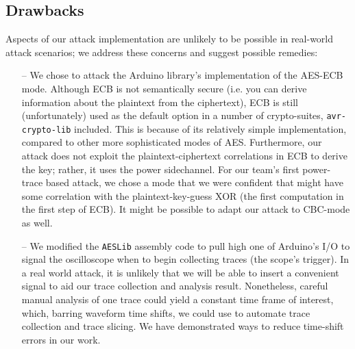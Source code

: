 \documentclass[journal]{ieee_style}
\begin{document}
\subsection{Drawbacks}
Aspects of our attack implementation are unlikely to be possible in real-world attack scenarios; we address these concerns and suggest possible remedies:
\begin{itemize}
    \item[--] We chose to attack the Arduino library's implementation of the AES-ECB mode. Although ECB is not semantically secure (i.e. you can derive information about the plaintext from the ciphertext), ECB is still (unfortunately) used as the default option in a number of crypto-suites, \texttt{avr-crypto-lib} included. This is because of its relatively simple implementation, compared to other more sophisticated modes of AES. Furthermore, our attack does not exploit the plaintext-ciphertext correlations in ECB to derive the key; rather, it uses the power sidechannel. For our team's first power-trace based attack, we chose a mode that we were confident that might have some correlation with the plaintext-key-guess XOR (the first computation in the first step of ECB). It might be possible to adapt our attack to CBC-mode as well.
    \item[--] We modified the \texttt{AESLib} assembly code to pull high one of Arduino's I/O to signal the oscilloscope when to begin collecting traces (the scope's trigger). In a real world attack, it is unlikely that we will be able to insert a convenient signal to aid our trace collection and analysis result. Nonetheless, careful manual analysis of one trace could yield a constant time frame of interest, which, barring waveform time shifts, we could use to automate trace collection and trace slicing. We have demonstrated ways to reduce time-shift errors in our work.
\end{itemize}
\end{document}
